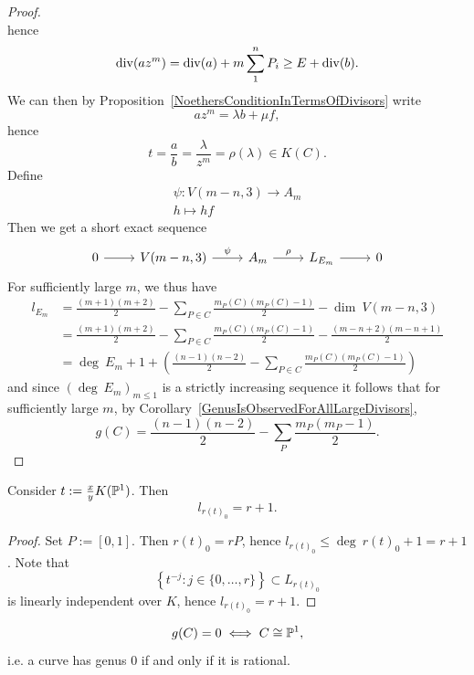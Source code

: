 \begin{proof}
$$        $$ 
        hence 
        $$
            \mathrm{div}(az^m)=\mathrm{div}(a)+m\sum_1^n P_i \geq E+\mathrm{div}(b).
        $$
        We can then by Proposition~\ref{NoethersConditionInTermsOfDivisors} write 
        $$
            az^m = \lambda b+\mu f,
        $$
        hence 
        $$
            t = \frac{a}{b} = \frac{\lambda}{z^m} = \rho(\lambda) \in K(C).
        $$  
        Define 
        \begin{gather*}
            \psi: V(m-n,3)\rightarrow A_m\\
            h\mapsto hf
        \end{gather*}
        Then we get a short exact sequence 
        $$
            \begin{tikzcd}
                0\arrow[r] & V(m-n,3) \arrow[r,"\psi"] & A_m \arrow[r,"\rho"] & L_{E_m} \arrow[r] & 0
            \end{tikzcd}
        $$
        For sufficiently large $m$, we thus have 
        \begin{align*}
            l_{E_m} &= \frac{(m+1)(m+2)}{2}-\sum_{P\in C} \frac{m_P(C)(m_P(C)-1)}{2} - \dim \ V(m-n,3)\\  &=  \frac{(m+1)(m+2)}{2}-\sum_{P\in C} \frac{m_P(C)(m_P(C)-1)}{2} - \frac{(m-n+2)(m-n+1)}{2}\\
            &= \deg \ E_m +1+\left(\frac{(n-1)(n-2)}{2}-\sum_{P\in C} \frac{m_P(C)(m_P(C)-1)}{2}\right)
        \end{align*}
        and since $(\deg \ E_m)_{m\leq 1}$ is a strictly increasing sequence it follows that for sufficiently large $m$, by Corollary~\ref{GenusIsObservedForAllLargeDivisors}, 
        $$
            g(C)= \frac{(n-1)(n-2)}{2}-\sum_{P}\frac{m_P(m_P-1)}{2}.
        $$
    \end{proof}
    \begin{lemma}
        Consider $t :=\frac{x}{y} K(\mathbb{P}^1)$. Then 
        $$
            l_{r(t)_0} = r+1.
        $$ 
    \end{lemma}
    \begin{proof}
        Set $P:=[0,1]$. Then $r(t)_0 = rP$, hence $l_{r(t)_0}\leq \deg\ r(t)_0 +1 = r +1$. Note that 
        $$
            \left\{t^{-j} : j\in\{0,\dots,r\} \right\} \subset L_{r(t)_0}
        $$ 
        is linearly independent over $K$, hence $l_{r(t)_0}=r+1$.
    \end{proof}
    \begin{proposition}
        $$
            g(C) = 0 \iff C \cong \mathbb{P}^1,
        $$
        i.e. a curve has genus $0$ if and only if it is rational.
    \end{proposition}
